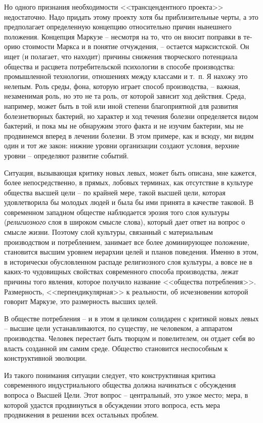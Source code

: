 \documentclass{book}
\begin{document}
Но одного признания необходимости <<трансцендентного проекта>> недостаточно. Надо придать этому проекту хотя бы приблизительные черты, а это предполагает определенную кон­цепцию относительно причин нынешнего положения. Концеп­ция Маркузе -- несмотря на то, что он вносит поправки в те­орию стоимости Маркса и в понятие отчуждения, -- остается марксистской. Он ищет (и полагает, что находит) причины снижения творческого потенциала общества и расцвета потре­бительской психологии в способе производства: промышлен­ной технологии, отношениях между классами и т.~п. Я нахожу это нелепым. Роль среды, фона, которую играет способ произ­водства, -- важная, незаменимая роль, но это не та роль, от ко­торой зависит ход действия. Среда, например, может быть в той или иной степени благоприятной для развития болезнетвор­ных бактерий, но характер и ход течения болезни определяется видом бактерий, и пока мы не обнаружим этого факта и не изучим бактерии, мы не продвинемся вперед в лечении болезни. В этом примере, как и всюду, ми 
видим один и тот же закон: нижние уровни организации создают условия, верхние уровни -- определяют развитие событий.

Ситуация, вызывающая критику новых левых, может быть описана, мне кажется, более непосредственно, в прямых, лобо­вых терминах, как отсутствие в культуре общества высшей це­ли -- по крайней мере, такой высшей цели, которая удовлетво­рила бы молодых людей и была бы ими принята в качестве та­ковой. В современном западном обществе наблюдается эрозия того слоя культуры (\textit{религиозного}  слоя в широком смысле слова), который дает ответ на вопрос о смысле жизни. Поэто­му слой культуры, связанный с материальным производством и потреблением, занимает все более доминирующее положение, становится высшим уровнем иерархии целей и планов поведе­ния. Именно в этом, в исторически обусловленном распаде ре­лигиозного слоя культуры, а вовсе не в каких-то чудовищных свойствах современного способа производства, лежат причины того явления, которое получило название <<общества потребле­ния>>. Размерность, <<перпендикулярная>> к реальности, об исчез­новении которой говорит Маркузе, это размерность высших целей.

В обществе потребления -- и в этом я целиком солидарен с критикой новых левых -- высшие цели устанавливаются, по су­ществу, не человеком, а аппаратом производства. Человек пе­рестает быть творцом и повелителем, он отдает себя во власть созданной им самим среде. Общество становится неспособным к конструктивной эволюции.

Из такого понимания ситуации следует, что конструктивная критика современного индустриального общества должна на­чинаться с обсуждения вопроса о Высшей Цели. Этот вопрос -- центральный, это узкое место; мера, в которой удастся продви­нуться в обсуждении этого вопроса, есть мера продвижения в решении всех остальных проблем.
\end{document}

